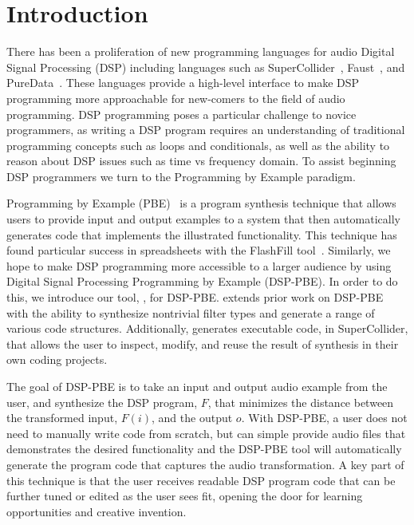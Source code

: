 
\section{Introduction}

There has been a proliferation of new programming languages for audio Digital Signal Processing (DSP) including languages such as SuperCollider~\cite{supercollider}, Faust~\cite{orlarey2009faust}, and PureData~\cite{puredata}.
These languages provide a high-level interface to make DSP programming more approachable for new-comers to the field of audio programming.
DSP programming poses a particular challenge to novice programmers, as writing a DSP program requires an understanding of traditional programming concepts such as loops and conditionals, as well as the ability to reason about DSP issues such as time vs frequency domain.
To assist beginning DSP programmers we turn to the Programming by Example paradigm.

Programming by Example (PBE)~\cite{cypher93,lieberman01} is a program synthesis technique that allows users to provide input and output examples to a system that then automatically generates code that implements the illustrated functionality.
This technique has found particular success in spreadsheets with the FlashFill tool~\cite{flashfill}.
Similarly, we hope to make DSP programming more accessible to a larger audience by using Digital Signal Processing Programming by Example (DSP-PBE).
In order to do this, we introduce our tool, \ourTool, for DSP-PBE.
\ourTool extends prior work on DSP-PBE~\cite{SantolucitoFARM} with the ability to synthesize nontrivial filter types and generate a range of various code structures.
Additionally, \ourTool generates executable code, in SuperCollider, that allows the user to inspect, modify, and reuse the result of synthesis in their own coding projects.

The goal of DSP-PBE is to take an input and output audio example from the user, and synthesize the DSP program, $F$, that minimizes the distance between the transformed input, $F(i)$, and the output $o$.
With DSP-PBE, a user does not need to manually write code from scratch, but can simple provide audio files that demonstrates the desired functionality and the DSP-PBE tool will automatically generate the program code that captures the audio transformation.
A key part of this technique is that the user receives readable DSP program code that can be further tuned or edited as the user sees fit, opening the door for learning opportunities and creative invention.


